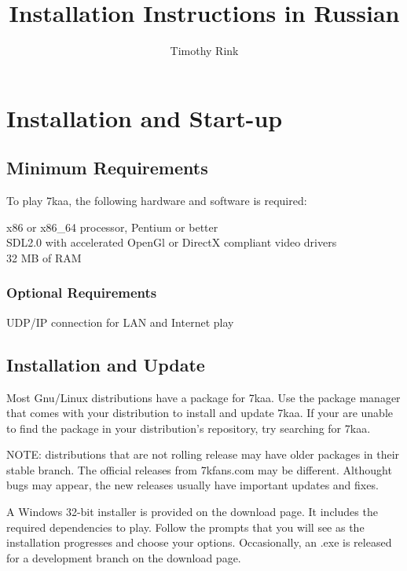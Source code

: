 \documentclass[10pt,a4paper]{article}
\author{Timothy Rink}
\title{Installation Instructions in Russian}
\begin{document}
	
\chapter{Installation and Start-up}
	
	\section{Minimum Requirements}
	
	To play 7kaa, the following hardware and software is required:
	
	\begin{adjustwidth}{1cm}{}
		x86 or x86\_64 processor, Pentium or better \\
		SDL2.0 with accelerated OpenGl or DirectX compliant video drivers \\
		32 MB of RAM
	\end{adjustwidth}
	
	\subsection{Optional Requirements}
	
	UDP/IP connection for LAN and Internet play
	
	\section{Installation and Update}
	
	
	Most Gnu/Linux distributions have a package for 7kaa. Use the package manager that comes with your distribution to install and update 7kaa. If your are unable to find the package in your distribution’s repository, try searching for 7kaa.
	
	NOTE: distributions that are not rolling release may have older packages in their stable branch. The official releases from 7kfans.com may be different. 
	Althought bugs may appear, the new releases usually have important updates and fixes.
	
	A Windows 32-bit installer is provided on the download page. It includes the required dependencies to play. 
	Follow the prompts that you will see as the installation progresses and choose your options. Occasionally, an .exe is released for a development branch on the download page.
	
\end{document}

